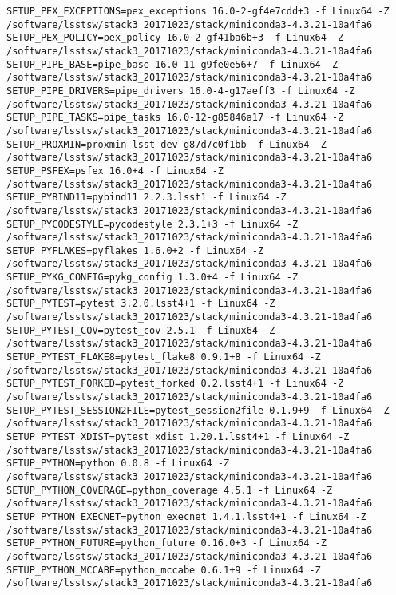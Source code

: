 \begin{verbatim}
SETUP_PEX_EXCEPTIONS=pex_exceptions 16.0-2-gf4e7cdd+3 -f Linux64 -Z /software/lsstsw/stack3_20171023/stack/miniconda3-4.3.21-10a4fa6
SETUP_PEX_POLICY=pex_policy 16.0-2-gf41ba6b+3 -f Linux64 -Z /software/lsstsw/stack3_20171023/stack/miniconda3-4.3.21-10a4fa6
SETUP_PIPE_BASE=pipe_base 16.0-11-g9fe0e56+7 -f Linux64 -Z /software/lsstsw/stack3_20171023/stack/miniconda3-4.3.21-10a4fa6
SETUP_PIPE_DRIVERS=pipe_drivers 16.0-4-g17aeff3 -f Linux64 -Z /software/lsstsw/stack3_20171023/stack/miniconda3-4.3.21-10a4fa6
SETUP_PIPE_TASKS=pipe_tasks 16.0-12-g85846a17 -f Linux64 -Z /software/lsstsw/stack3_20171023/stack/miniconda3-4.3.21-10a4fa6
SETUP_PROXMIN=proxmin lsst-dev-g87d7c0f1bb -f Linux64 -Z /software/lsstsw/stack3_20171023/stack/miniconda3-4.3.21-10a4fa6
SETUP_PSFEX=psfex 16.0+4 -f Linux64 -Z /software/lsstsw/stack3_20171023/stack/miniconda3-4.3.21-10a4fa6
SETUP_PYBIND11=pybind11 2.2.3.lsst1 -f Linux64 -Z /software/lsstsw/stack3_20171023/stack/miniconda3-4.3.21-10a4fa6
SETUP_PYCODESTYLE=pycodestyle 2.3.1+3 -f Linux64 -Z /software/lsstsw/stack3_20171023/stack/miniconda3-4.3.21-10a4fa6
SETUP_PYFLAKES=pyflakes 1.6.0+2 -f Linux64 -Z /software/lsstsw/stack3_20171023/stack/miniconda3-4.3.21-10a4fa6
SETUP_PYKG_CONFIG=pykg_config 1.3.0+4 -f Linux64 -Z /software/lsstsw/stack3_20171023/stack/miniconda3-4.3.21-10a4fa6
SETUP_PYTEST=pytest 3.2.0.lsst4+1 -f Linux64 -Z /software/lsstsw/stack3_20171023/stack/miniconda3-4.3.21-10a4fa6
SETUP_PYTEST_COV=pytest_cov 2.5.1 -f Linux64 -Z /software/lsstsw/stack3_20171023/stack/miniconda3-4.3.21-10a4fa6
SETUP_PYTEST_FLAKE8=pytest_flake8 0.9.1+8 -f Linux64 -Z /software/lsstsw/stack3_20171023/stack/miniconda3-4.3.21-10a4fa6
SETUP_PYTEST_FORKED=pytest_forked 0.2.lsst4+1 -f Linux64 -Z /software/lsstsw/stack3_20171023/stack/miniconda3-4.3.21-10a4fa6
SETUP_PYTEST_SESSION2FILE=pytest_session2file 0.1.9+9 -f Linux64 -Z /software/lsstsw/stack3_20171023/stack/miniconda3-4.3.21-10a4fa6
SETUP_PYTEST_XDIST=pytest_xdist 1.20.1.lsst4+1 -f Linux64 -Z /software/lsstsw/stack3_20171023/stack/miniconda3-4.3.21-10a4fa6
SETUP_PYTHON=python 0.0.8 -f Linux64 -Z /software/lsstsw/stack3_20171023/stack/miniconda3-4.3.21-10a4fa6
SETUP_PYTHON_COVERAGE=python_coverage 4.5.1 -f Linux64 -Z /software/lsstsw/stack3_20171023/stack/miniconda3-4.3.21-10a4fa6
SETUP_PYTHON_EXECNET=python_execnet 1.4.1.lsst4+1 -f Linux64 -Z /software/lsstsw/stack3_20171023/stack/miniconda3-4.3.21-10a4fa6
SETUP_PYTHON_FUTURE=python_future 0.16.0+3 -f Linux64 -Z /software/lsstsw/stack3_20171023/stack/miniconda3-4.3.21-10a4fa6
SETUP_PYTHON_MCCABE=python_mccabe 0.6.1+9 -f Linux64 -Z /software/lsstsw/stack3_20171023/stack/miniconda3-4.3.21-10a4fa6

\end{verbatim}
